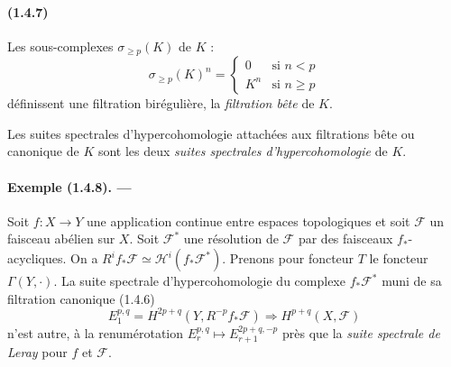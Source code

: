 \documentclass[10pt]{article}
\newcommand{\calH}{\mathcal H}
\newcommand{\calF}{\mathcal F}
\begin{document}
\paragraph{(1.4.7)} Les sous-complexes $\sigma_{\ge p}(K)$ de $K$ :
\[
\sigma_{\ge p}(K)^n=\begin{cases}
0& \text{si }n<p\\
K^n& \text{si }n\ge p
\end{cases}
\]
définissent une filtration birégulière, la \emph{filtration bête} de $K$.

Les suites spectrales d'hypercohomologie attachées aux filtrations bête ou canonique de $K$ sont les deux \emph{suites spectrales d'hypercohomologie} de $K$.

\paragraph{Exemple (1.4.8). ---} Soit $f:X\to Y$ une application continue entre espaces topologiques et soit $\calF$ un faisceau abélien sur $X$. Soit $\calF^*$ une résolution de $\calF$ par des faisceaux $f_*$-acycliques. On a $R^if_*\calF\simeq\calH^i(f_*\calF^*)$. Prenons pour foncteur $T$ le foncteur $\Gamma(Y,\cdot)$. La suite spectrale d'hypercohomologie du complexe $f_*\calF^*$ muni de sa filtration canonique (1.4.6)
\[
E_1^{p,q}=H^{2p+q}(Y,R^{-p}f_*\calF)\Rightarrow H^{p+q}(X,\calF)
\]
n'est autre, à la renumérotation $E_r^{p,q}\mapsto E_{r+1}^{2p+q,-p}$ près que la \emph{suite spectrale de Leray} pour $f$ et $\calF$.
\end{document}
